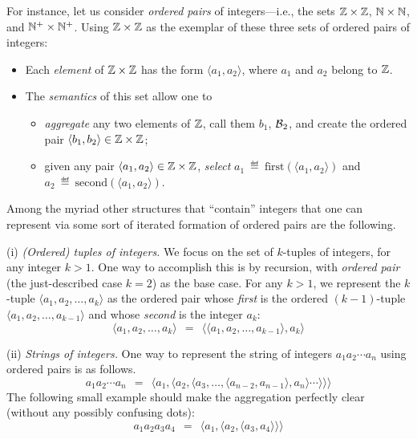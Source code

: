 For instance, let us consider {\em ordered pairs}
of integers---i.e., the sets $\mathbb{Z} \times \mathbb{Z}$, $\mathbb{N} \times \mathbb{N}$, and $\mathbb{N}^+
\times \mathbb{N}^+$.  Using $\mathbb{Z} \times \mathbb{Z}$ as the exemplar of these three
sets of ordered pairs of integers:
\begin{itemize}
\item
Each {\em element} of $\mathbb{Z} \times \mathbb{Z}$ has the form $\langle a_1, a_2
\rangle$, where $a_1$ and $a_2$ belong to $\mathbb{Z}$.
\item
The {\em semantics} of this set allow one to
  \begin{itemize}
  \item
{\em aggregate} any two elements of $\mathbb{Z}$, call them $b_1$, $\mbox{$\cal B$}_2$, and
create the ordered pair $\langle b_1, b_2 \rangle \in \mathbb{Z} \times \mathbb{Z}$;
  \item
given any pair $\langle a_1, a_2 \rangle \in \mathbb{Z} \times \mathbb{Z}$, {\em
  select} $a_1 \ \eqdef \ \mbox{first}(\langle a_1, a_2 \rangle)$ and
$a_2 \ \eqdef \ \mbox{second}(\langle a_1, a_2 \rangle)$.
  \end{itemize}
\end{itemize}

Among the myriad other structures that ``contain'' integers that one
can represent via some sort of iterated formation of ordered pairs are
the following.

\noindent
(i) {\em (Ordered) tuples of integers.}
%
We focus on the set of $k$-tuples of integers, for any integer $k >
1$.  One way to accomplish this is by recursion, with {\em ordered
  pair} (the just-described case $k=2$) as the base case.  For any $k
> 1$, we represent the $k$-tuple $\langle a_1, a_2, \ldots, a_k
\rangle$ as the ordered pair whose {\em first} is the ordered
$(k-1)$-tuple $\langle a_1, a_2, \ldots, a_{k-1} \rangle$ and whose
{\em second} is the integer $a_k$:
\[ \langle a_1, a_2, \ldots, a_k \rangle \ \ = \ \
\langle \langle a_1, a_2, \ldots, a_{k-1} \rangle, a_k \rangle \]

\noindent
(ii) {\em Strings of integers.}
%
One way to represent the string of integers $a_1 a_2 \cdots a_n$ using
ordered pairs is as follows.
\[ a_1 a_2 \cdots a_n \ \ = \ \
\langle a_1, \langle a_2, \langle a_3, \ldots, \langle a_{n-2},  a_{n-1}
\rangle, a_n \rangle \cdots \rangle \rangle \rangle
\]
The following small example should make the aggregation perfectly
clear (without any possibly confusing dots):
\[ a_1 a_2 a_3 a_4 \ \ = \ \
\langle a_1, \langle a_2, \langle a_3,  a_4 \rangle \rangle \rangle
\]

